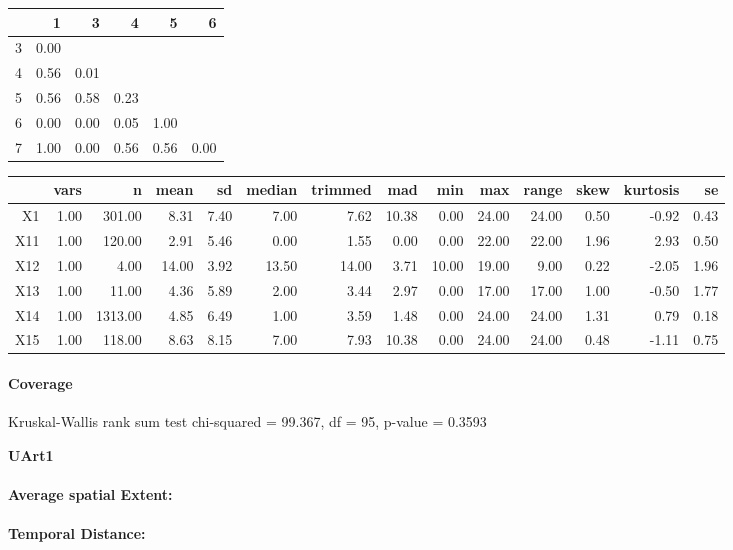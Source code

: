 \begin{tabular}{rrrrrr}
  \hline
 & 1 & 3 & 4 & 5 & 6 \\ 
  \hline
3 & 0.00 &  &  &  &  \\ 
  4 & 0.56 & 0.01 &  &  &  \\ 
  5 & 0.56 & 0.58 & 0.23 &  &  \\ 
  6 & 0.00 & 0.00 & 0.05 & 1.00 &  \\ 
  7 & 1.00 & 0.00 & 0.56 & 0.56 & 0.00 \\ 
   \hline
\end{tabular}

\begin{tabular}{rrrrrrrrrrrrrr}
  \hline
 & vars & n & mean & sd & median & trimmed & mad & min & max & range & skew & kurtosis & se \\ 
  \hline
X1 & 1.00 & 301.00 & 8.31 & 7.40 & 7.00 & 7.62 & 10.38 & 0.00 & 24.00 & 24.00 & 0.50 & -0.92 & 0.43 \\ 
  X11 & 1.00 & 120.00 & 2.91 & 5.46 & 0.00 & 1.55 & 0.00 & 0.00 & 22.00 & 22.00 & 1.96 & 2.93 & 0.50 \\ 
  X12 & 1.00 & 4.00 & 14.00 & 3.92 & 13.50 & 14.00 & 3.71 & 10.00 & 19.00 & 9.00 & 0.22 & -2.05 & 1.96 \\ 
  X13 & 1.00 & 11.00 & 4.36 & 5.89 & 2.00 & 3.44 & 2.97 & 0.00 & 17.00 & 17.00 & 1.00 & -0.50 & 1.77 \\ 
  X14 & 1.00 & 1313.00 & 4.85 & 6.49 & 1.00 & 3.59 & 1.48 & 0.00 & 24.00 & 24.00 & 1.31 & 0.79 & 0.18 \\ 
  X15 & 1.00 & 118.00 & 8.63 & 8.15 & 7.00 & 7.93 & 10.38 & 0.00 & 24.00 & 24.00 & 0.48 & -1.11 & 0.75 \\ 
   \hline
\end{tabular}

\paragraph{Coverage}
Kruskal-Wallis rank sum test chi-squared = 99.367, df = 95, p-value = 0.3593

\large
\centerline{\textbf{UArt1}}
\normalsize

\paragraph{Average spatial Extent:}
\paragraph{Temporal Distance:}
